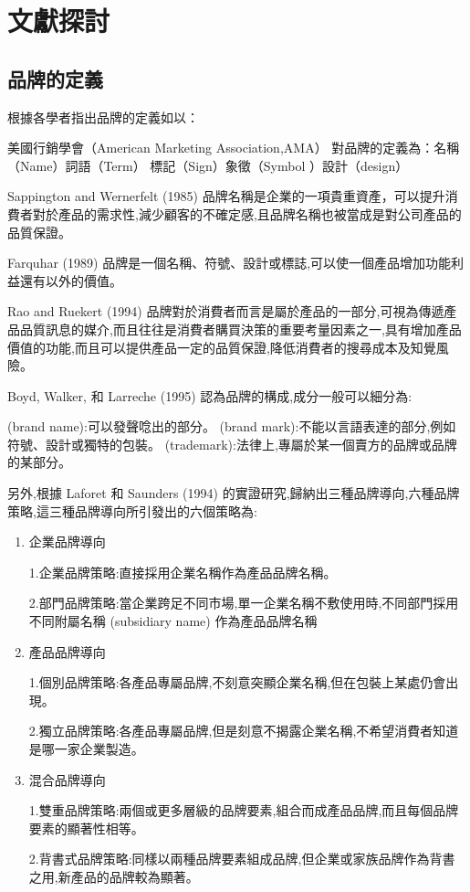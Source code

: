 \chapter{文獻探討}


\section{品牌的定義}

根據各學者指出品牌的定義如以：

美國行銷學會（American Marketing Association,AMA）
對品牌的定義為：名稱 （Name）詞語（Term） 標記（Sign）象徵（Symbol ）設計（design）\cite{AMA}

Sappington and Wernerfelt (1985) \cite{Sappington}品牌名稱是企業的一項貴重資產，可以提升消費者對於產品的需求性,減少顧客的不確定感,且品牌名稱也被當成是對公司產品的品質保證。

Farquhar (1989) \cite{Farquhar}品牌是一個名稱、符號、設計或標誌,可以使一個產品增加功能利益還有以外的價值。

Rao and Ruekert (1994) \cite{Rao}品牌對於消費者而言是屬於產品的一部分,可視為傳遞產品品質訊息的媒介,而且往往是消費者購買決策的重要考量因素之一,具有增加產品價值的功能,而且可以提供產品一定的品質保證,降低消費者的搜尋成本及知覺風險。

Boyd, Walker, 和 Larreche (1995)\cite{Boyd} 認為品牌的構成,成分一般可以細分為:
\begin{enumerate}
(brand name):可以發聲唸出的部分。
(brand mark):不能以言語表達的部分,例如符號、設計或獨特的包裝。 
(trademark):法律上,專屬於某一個賣方的品牌或品牌的某部分。
\end{enumerate}

另外,根據 Laforet 和 Saunders (1994)\cite{Laforet} 的實證研究,歸納出三種品牌導向,六種品牌策略,這三種品牌導向所引發出的六個策略為:
\begin{enumerate}
\item 企業品牌導向

1.企業品牌策略:直接採用企業名稱作為產品品牌名稱。 

2.部門品牌策略:當企業跨足不同市場,單一企業名稱不敷使用時,不同部門採用不同附屬名稱 (subsidiary name) 作為產品品牌名稱
\item 產品品牌導向

1.個別品牌策略:各產品專屬品牌,不刻意突顯企業名稱,但在包裝上某處仍會出現。

2.獨立品牌策略:各產品專屬品牌,但是刻意不揭露企業名稱,不希望消費者知道是哪一家企業製造。
\item 混合品牌導向

1.雙重品牌策略:兩個或更多層級的品牌要素,組合而成產品品牌,而且每個品牌要素的顯著性相等。

2.背書式品牌策略:同樣以兩種品牌要素組成品牌,但企業或家族品牌作為背書之用,新產品的品牌較為顯著。
\end{enumerate}

